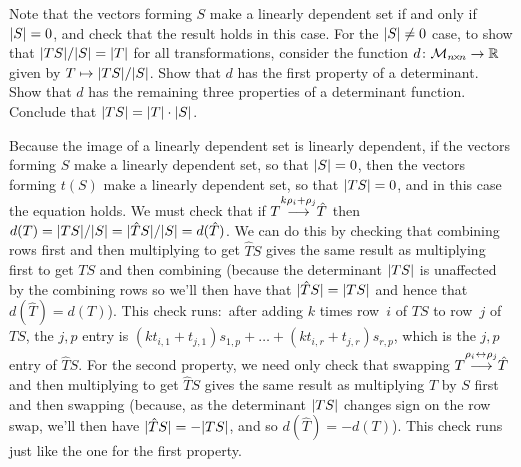 \begin{exercises}
    \begin{exparts}
      \partsitem Note that the vectors forming
        $S$ make a linearly dependent set if and only if 
        $\deter{S}=0$, and check that the result holds in this case.
      \partsitem For the $\deter{S}\neq 0$ case, to show that  
        $\deter{TS}/\deter{S}=\deter{T}$ for all transformations, consider
        the function
        \( \mbox{$d\colon \mathcal{M}_{n \! \times \! n}\to \mathbb{R}$} \) given by
        \( T\mapsto \deter{TS}/\deter{S} \).
        Show that $d$ has the first property of a determinant.
      \partsitem Show that $d$ has the remaining three properties of
        a determinant function.
      \partsitem Conclude that $\deter{TS}=\deter{T}\cdot\deter{S}$. 
    \end{exparts}
    \begin{answer}
      \begin{exparts}
        \partsitem Because the image of a linearly dependent set is 
          linearly dependent,
          if the vectors forming $S$ make a linearly dependent set, 
          so that $\deter{S}=0$,
          then the vectors forming $t(S)$ make a linearly dependent set,
          so that $\deter{TS}=0$, and in this case the equation holds.
        \partsitem We must check that if
          $T\smash[b]{\mathrel{ \mathop{\longrightarrow}\limits^{k\rho_i+\rho_j\mathstrut}_{ \begin{subarray}{l} \relax \end{subarray}}}}\hat{T}$ then 
          $d(T)=\deter{TS}/\deter{S}=\deter{\hat{T}S}/\deter{S}=d(\hat{T})$.
          We can do this by checking that combining rows first and
          then multiplying to get \( \hat{T}S \) gives the same result as
          multiplying first to get \( TS \) and then combining
          (because the determinant \( \deter{TS} \) is unaffected by the
          combining rows 
          so we'll then have that \( \deter{\hat{T}S}=\deter{TS} \) and
          hence that \( d(\hat{T})=d(T) \)).
          This check runs:~after adding 
          \( k \) times row~\( i \) of \( TS \) to
          row~$j$ of \( TS \), the \( j,p \) entry is
          \( (kt_{i,1}+t_{j,1})s_{1,p}+\dots+(kt_{i,r}+t_{j,r})s_{r,p} \),
          which is the \( j,p \) entry of \( \hat{T}S \).
        \partsitem For the second property, we need only check that swapping
          $T\smash[b]{\mathrel{ \mathop{\longrightarrow}\limits^{\rho_i\leftrightarrow\rho_j\mathstrut}_{ \begin{subarray}{l} \relax \end{subarray}}}}\hat{T}$
          and then multiplying to get \( \hat{T}S \) gives the same result as
          multiplying \( T \) by \( S \) first and then swapping 
          (because,
          as the determinant \( \deter{TS} \) changes sign on
          the row swap, we'll then have \( \deter{\hat{T}S}=-\deter{TS} \),
          and so \( d(\hat{T})=-d(T) \)). 
          This check runs just like the one for the first property.


\end{exparts}
\end{answer}
\end{exercises}
